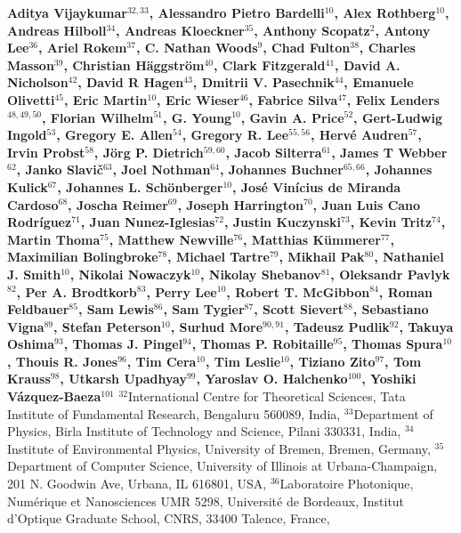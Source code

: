 
{\bfseries
Aditya Vijaykumar$^{32,33}$, 
Alessandro Pietro Bardelli$^{10}$, 
Alex Rothberg$^{10}$, 
Andreas Hilboll$^{34}$, 
Andreas Kloeckner$^{35}$, 
Anthony Scopatz$^{2}$, 
Antony Lee$^{36}$, 
Ariel Rokem$^{37}$, 
C. Nathan Woods$^{9}$, 
Chad Fulton$^{38}$, 
Charles Masson$^{39}$, 
Christian H\"aggstr\"om$^{40}$, 
Clark Fitzgerald$^{41}$, 
David A. Nicholson$^{42}$, 
David R Hagen$^{43}$, 
Dmitrii V. Pasechnik$^{44}$, 
Emanuele Olivetti$^{45}$, 
Eric Martin$^{10}$, 
Eric Wieser$^{46}$, 
Fabrice Silva$^{47}$, 
Felix Lenders$^{48,49,50}$, 
Florian Wilhelm$^{51}$, 
G. Young$^{10}$, 
Gavin A. Price$^{52}$, 
Gert-Ludwig Ingold$^{53}$, 
Gregory E. Allen$^{54}$, 
Gregory R. Lee$^{55,56}$, 
Herv\'e Audren$^{57}$, 
Irvin Probst$^{58}$, 
J\"org P. Dietrich$^{59,60}$, 
Jacob Silterra$^{61}$, 
James T Webber$^{62}$, 
Janko Slavi\v{c}$^{63}$, 
Joel Nothman$^{64}$, 
Johannes Buchner$^{65,66}$, 
Johannes Kulick$^{67}$, 
Johannes L. Sch\"{o}nberger$^{10}$, 
Jos\'e Vin\'icius de Miranda Cardoso$^{68}$, 
Joscha Reimer$^{69}$, 
Joseph Harrington$^{70}$, 
Juan Luis Cano Rodr\'iguez$^{71}$, 
Juan Nunez-Iglesias$^{72}$, 
Justin Kuczynski$^{73}$, 
Kevin Tritz$^{74}$, 
Martin Thoma$^{75}$, 
Matthew Newville$^{76}$, 
Matthias K\"ummerer$^{77}$, 
Maximilian Bolingbroke$^{78}$, 
Michael Tartre$^{79}$, 
Mikhail Pak$^{80}$, 
Nathaniel J. Smith$^{10}$, 
Nikolai Nowaczyk$^{10}$, 
Nikolay Shebanov$^{81}$, 
Oleksandr Pavlyk$^{82}$, 
Per A. Brodtkorb$^{83}$, 
Perry Lee$^{10}$, 
Robert T. McGibbon$^{84}$, 
Roman Feldbauer$^{85}$, 
Sam Lewis$^{86}$, 
Sam Tygier$^{87}$, 
Scott Sievert$^{88}$, 
Sebastiano Vigna$^{89}$, 
Stefan Peterson$^{10}$, 
Surhud More$^{90,91}$, 
Tadeusz Pudlik$^{92}$, 
Takuya Oshima$^{93}$, 
Thomas J. Pingel$^{94}$, 
Thomas P. Robitaille$^{95}$, 
Thomas Spura$^{10}$, 
Thouis R. Jones$^{96}$, 
Tim Cera$^{10}$, 
Tim Leslie$^{10}$, 
Tiziano Zito$^{97}$, 
Tom Krauss$^{98}$, 
Utkarsh Upadhyay$^{99}$, 
Yaroslav O. Halchenko$^{100}$, 
Yoshiki V\'azquez-Baeza$^{101}$
}
\newline
\hfill \break
$^{32}$International Centre for Theoretical Sciences, Tata Institute of Fundamental Research, Bengaluru 560089, India, 
$^{33}$Department of Physics, Birla Institute of Technology and Science, Pilani 330331, India, 
$^{34}$Institute of Environmental Physics, University of Bremen, Bremen, Germany, 
$^{35}$Department of Computer Science, University of Illinois at Urbana-Champaign, 201 N. Goodwin Ave, Urbana, IL 616801, USA, 
$^{36}$Laboratoire Photonique, Num\'erique et Nanosciences UMR 5298, Universit\'e de Bordeaux, Institut d'Optique Graduate School, CNRS, 33400 Talence, France, 
